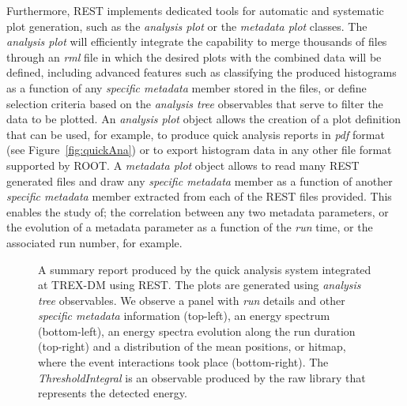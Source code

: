 Furthermore, REST implements dedicated tools for automatic and systematic plot generation, such as the \emph{analysis plot} or the \emph{metadata plot} classes. 
The \emph{analysis plot} will efficiently integrate the capability to merge thousands of files through an \emph{rml} file in which the desired plots with the combined data will be defined, including advanced features such as classifying the produced histograms as a function of any \emph{specific metadata} member stored in the files, or define selection criteria based on the \emph{analysis tree} observables that serve to filter the data to be plotted. An \emph{analysis plot} object allows the creation of a plot definition that can be used, for example, to produce quick analysis reports in \emph{pdf} format (see Figure~\ref{fig:quickAna}) or to export histogram data in any other file format supported by ROOT.
A \emph{metadata plot} object allows to read many REST generated files and draw any \emph{specific metadata} member as a function of another \emph{specific metadata} member extracted from each of the REST files provided. This enables the study of; the correlation between any two metadata parameters, or the evolution of a metadata parameter as a function of the \emph{run} time, or the associated run number, for example.

\begin{figure}[h]
  \centering
	\caption{A summary report produced by the quick analysis system integrated at TREX-DM using REST. The plots are generated using \emph{analysis tree} observables. We observe a panel with \emph{run} details and other \emph{specific metadata} information (top-left), an energy spectrum (bottom-left), an energy spectra evolution along the run duration (top-right) and a distribution of the mean positions, or hitmap, where the event interactions took place (bottom-right). The \emph{ThresholdIntegral} is an observable produced by the raw library that represents the detected energy.}
	\label{fig:executables}
\end{figure}


